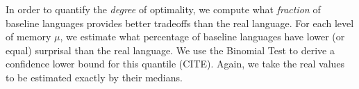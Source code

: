


%















In order to quantify the \emph{degree} of optimality, we compute what \emph{fraction} of baseline languages provides better tradeoffs than the real language.
For each level of memory $\mu$, we estimate what percentage of baseline languages have lower (or equal) surprisal than the real language.
We use the Binomial Test to derive a confidence lower bound for this quantile (CITE).
Again, we take the real values to be estimated exactly by their medians.

